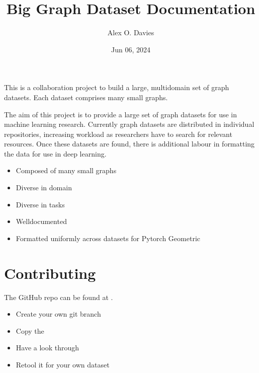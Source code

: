\documentclass[letterpaper,10pt,english]{sphinxhowto}
\title{Big Graph Dataset Documentation}
\date{Jun 06, 2024}
\author{Alex O. Davies}
\begin{document}
\pagestyle{empty}
\sphinxmaketitle
\pagestyle{plain}
\sphinxtableofcontents
\pagestyle{normal}
\label{\detokenize{index::doc}}


\sphinxAtStartPar
This is a collaboration project to build a large, multi\sphinxhyphen{}domain set of graph datasets.
Each dataset comprises many small graphs.

\sphinxAtStartPar
The aim of this project is to provide a large set of graph datasets for use in machine learning research.
Currently graph datasets are distributed in individual repositories, increasing workload as researchers have to search for relevant resources.
Once these datasets are found, there is additional labour in formatting the data for use in deep learning.
\begin{description}
\begin{itemize}
\item {} 
\sphinxAtStartPar
Composed of many small graphs

\item {} 
\sphinxAtStartPar
Diverse in domain

\item {} 
\sphinxAtStartPar
Diverse in tasks

\item {} 
\sphinxAtStartPar
Well\sphinxhyphen{}documented

\item {} 
\sphinxAtStartPar
Formatted uniformly across datasets for Pytorch Geometric

\end{itemize}

\end{description}


\section{Contributing}
\label{\detokenize{index:contributing}}
\sphinxAtStartPar
The GitHub repo can be found at .
\begin{description}
\begin{itemize}
\item {} 
\sphinxAtStartPar
Create your own git branch

\item {} 
\sphinxAtStartPar
Copy the 

\item {} 
\sphinxAtStartPar
Have a look through

\item {} 
\sphinxAtStartPar
Re\sphinxhyphen{}tool it for your own dataset

\end{itemize}

\end{description}
\end{document}
